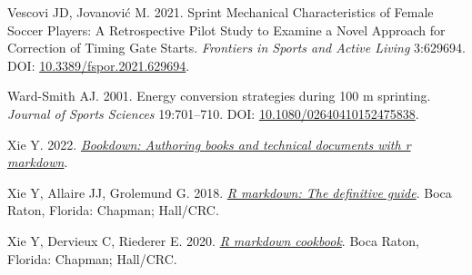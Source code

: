 \documentclass[fleqn,10pt]{wlpeerj} %
\newlength{\cslhangindent}
\newlength{\cslentryspacingunit} %
\newenvironment{CSLReferences}[2] %
 {%
  \setlength{\parindent}{0pt}
  \ifodd #1
  \let\oldpar\par
  \def\par{\hangindent=\cslhangindent\oldpar}
  \fi
  \setlength{\parskip}{#2\cslentryspacingunit}
 }%
 {}
\begin{document}
\begin{CSLReferences}{1}{0}
\leavevmode{}%
Vescovi JD, Jovanović M. 2021. Sprint {Mechanical Characteristics} of {Female Soccer Players}: {A Retrospective Pilot Study} to {Examine} a {Novel Approach} for {Correction} of {Timing Gate Starts}. \emph{Frontiers in Sports and Active Living} 3:629694. DOI: \href{https://doi.org/10.3389/fspor.2021.629694}{10.3389/fspor.2021.629694}.

\leavevmode{}%
Ward-Smith AJ. 2001. Energy conversion strategies during 100 m sprinting. \emph{Journal of Sports Sciences} 19:701--710. DOI: \href{https://doi.org/10.1080/02640410152475838}{10.1080/02640410152475838}.

\leavevmode{}%
Xie Y. 2022. \emph{\href{https://CRAN.R-project.org/package=bookdown}{Bookdown: Authoring books and technical documents with r markdown}}.

\leavevmode{}%
Xie Y, Allaire JJ, Grolemund G. 2018. \emph{\href{https://bookdown.org/yihui/rmarkdown}{R markdown: The definitive guide}}. Boca Raton, Florida: Chapman; Hall/CRC.

\leavevmode{}%
Xie Y, Dervieux C, Riederer E. 2020. \emph{\href{https://bookdown.org/yihui/rmarkdown-cookbook}{R markdown cookbook}}. Boca Raton, Florida: Chapman; Hall/CRC.

\end{CSLReferences}
\end{document}
